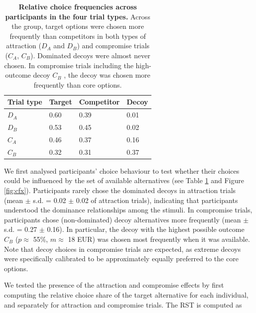 \documentclass[11pt, a4paper]{article}
\begin{document}
\begin{table}[bt!]
\begin{centering}
\begin{tabular}{@{}llll@{}}
\toprule
\textbf{Trial type} & \textbf{Target} & \textbf{Competitor} & \textbf{Decoy} \\ \midrule
$D_A$               & 0.60            & 0.39                & 0.01           \\
$D_B$               & 0.53            & 0.45                & 0.02           \\
$C_A$               & 0.46            & 0.37                & 0.16           \\
$C_B$               & 0.32            & 0.31                & 0.37           \\ \bottomrule
\end{tabular}
\caption{\textbf{Relative choice frequencies across participants in the four trial types.} Across the group, target options were chosen more frequently than competitors in both types of attraction ($D_A$ and $D_B$) and compromise trials ($C_A$, $C_B$). Dominated decoys were almost never chosen. In compromise trials including the high-outcome decoy $C_B$ , the decoy was chosen more frequently than core options.}
\label{tab:choicefreqs}
\end{centering}
\end{table}

We first analysed participants' choice behaviour to test whether their choices could be influenced by the set of available alternatives (see Table \ref{tab:choicefreqs} and Figure \ref{fig:cfx}). Participants rarely chose the dominated decoys in attraction trials (mean $\pm$ s.d. = 0.02 $\pm$ 0.02 of attraction trials), indicating that participants understood the dominance relationships among the stimuli. In compromise trials, participants chose (non-dominated) decoy alternatives more frequently (mean $\pm$ s.d. = 0.27 $\pm$ 0.16). In particular, the decoy with the highest possible outcome $C_B$ ($p \approx$ 55\%, $m \approx$ 18 EUR) was chosen most frequently when it was available. Note that decoy choices in compromise trials are expected, as extreme decoys were specifically calibrated to be approximately equally preferred to the core options. 

We tested the presence of the attraction and compromise effects by first computing the relative choice share of the target alternative \parencite[RST;][]{berkowitsch2014RigorouslyTestingMultialternative} for each individual, and separately for attraction and compromise trials. The RST is computed as
\end{document}
